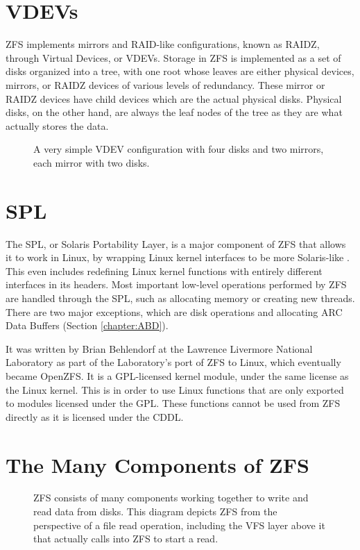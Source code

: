 \section{VDEVs}
ZFS implements mirrors and RAID-like configurations, known as RAIDZ, through Virtual Devices, or VDEVs.
Storage in ZFS is implemented as a set of disks organized into a tree, with one root whose leaves are either
physical devices, mirrors, or RAIDZ devices of various levels of redundancy.
These mirror or RAIDZ devices have child devices which are the actual physical disks.
Physical disks, on the other hand, are always the leaf nodes of the tree as they are what actually stores the data.

\begin{figure}[H]
    \centering
    \resizebox{0.75\linewidth}{!}{}
    \captionsetup{width=0.75\linewidth}
    \caption{A very simple VDEV configuration with four disks and two mirrors, each mirror with two disks.}
    \label{fig:VDEVExample}
\end{figure}

\section{SPL}
The SPL, or Solaris Portability Layer, is a major component of ZFS that allows it to work in Linux, 
by wrapping Linux kernel interfaces to be more Solaris-like \cite{zfs}.
This even includes redefining Linux kernel functions with entirely different interfaces in its headers.
Most important low-level operations performed by ZFS are handled through the SPL, such as allocating memory or creating new threads.
There are two major exceptions, which are disk operations and allocating ARC Data Buffers (Section \ref{chapter:ABD}).

It was written by Brian Behlendorf at the Lawrence Livermore National Laboratory as part of the Laboratory's port of ZFS to Linux,
which eventually became OpenZFS.
It is a GPL-licensed kernel module, under the same license as the Linux kernel. 
This is in order to use Linux functions that are only exported to modules licensed under the GPL.
These functions cannot be used from ZFS directly as it is licensed under the CDDL.

\section{The Many Components of ZFS}

\begin{figure}[H]
    \centering
    \resizebox{!}{0.35\textheight}{}
    \caption{ZFS consists of many components working together to write and read data from disks.
    This diagram depicts ZFS from the perspective of a file read operation,
    including the VFS layer above it that actually calls into ZFS to start a read.}
    \label{fig:ZFSOrganization}
\end{figure}

